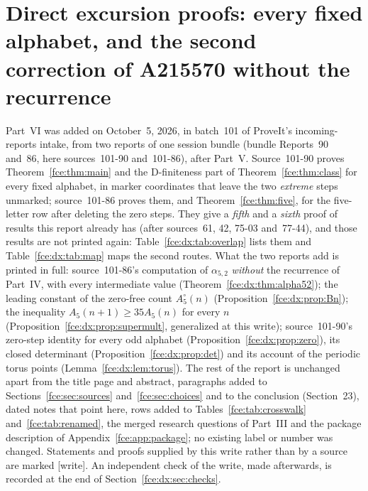 \documentclass[11pt,a4paper]{article}
\numberwithin{equation}{section}
\theoremstyle{definition}\newtheorem{definition}[theorem]{Definition}
\theoremstyle{remark}\newtheorem{remark}[theorem]{Remark}
\begin{document}
\part{Direct excursion proofs: every fixed alphabet, and the second correction of A215570 without the recurrence}\label{fce:dx:part}

Part~VI was added on October~5, 2026, in batch~101 of ProveIt's
incoming-reports intake, from two reports of one session bundle (bundle
Reports~90 and~86, here sources~101-90 and~101-86), after Part~V.
Source~101-90 proves Theorem~\ref{fce:thm:main} and the D-finiteness part of
Theorem~\ref{fce:thm:class} for every fixed alphabet, in marker coordinates
that leave the two \emph{extreme} steps unmarked; source~101-86 proves them,
and Theorem~\ref{fce:thm:five}, for the five-letter row after deleting the
zero steps. They give a \emph{fifth} and a \emph{sixth} proof of results this
report already has (after sources~61, 42, 75-03 and~77-44), and those
results are not printed again: Table~\ref{fce:dx:tab:overlap} lists them and
Table~\ref{fce:dx:tab:map} maps the second routes. What the two reports add
is printed in full: source~101-86's computation of $\alpha_{5,2}$
\emph{without} the recurrence of Part~IV, with every intermediate value
(Theorem~\ref{fce:dx:thm:alpha52}); the leading constant of the zero-free
count $A^\circ_5(n)$ (Proposition~\ref{fce:dx:prop:Bn}); the inequality
$A_5(n+1)\ge35A_5(n)$ for every $n$ (Proposition~\ref{fce:dx:prop:supermult},
generalized at this write); source~101-90's zero-step identity for every odd
alphabet (Proposition~\ref{fce:dx:prop:zero}), its closed determinant
(Proposition~\ref{fce:dx:prop:det}) and its account of the periodic torus
points (Lemma~\ref{fce:dx:lem:torus}). The rest of the report is unchanged
apart from the title page and abstract, paragraphs added to
Sections~\ref{fce:sec:sources} and~\ref{fce:sec:choices} and to the
conclusion (Section~23), dated notes that point here, rows added to
Tables~\ref{fce:tab:crosswalk} and~\ref{fce:tab:renamed}, the merged research
questions of Part~III and the package description of
Appendix~\ref{fce:app:package}; no existing label or number was changed.
Statements and proofs supplied by this write rather than by a source are
marked \textup{[write]}. An independent check of the write, made afterwards,
is recorded at the end of Section~\ref{fce:dx:sec:checks}.
\end{document}
